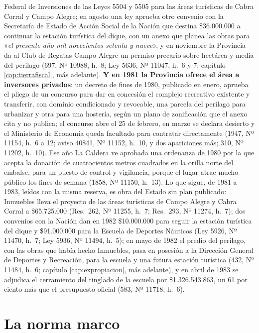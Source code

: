 \begin{cautela}
Federal de Inversiones de las Leyes 5504 y 5505 para las áreas turísticas de Cabra Corral y Campo Alegre; en agosto una ley aprueba otro convenio con la Secretaría de Estado de Acción Social de la Nación que destina \$36.000.000 a continuar la estación turística del dique, con un anexo que planea las obras para «\textit{el presente año mil novecientos setenta y nueve}», y en noviembre la Provincia da al Club de Regatas Campo Alegre un permiso precario sobre hectárea y media del perilago (697, Nº 10988, h.\ 8; Ley 5636, Nº 11047, h.\ 6 y 7; capítulo \ref{cap:tierrafiscal}, más adelante). \textbf{Y en 1981 la Provincia ofrece el área a inversores privados}: un decreto de fines de 1980, publicado en enero, aprueba el pliego de un concurso para dar en concesión el complejo recreativo existente y transferir, con dominio condicionado y revocable, una parcela del perilago para urbanizar y otra para una hostería, según un plano de zonificación que el anexo cita y no publica; el concurso abre el 25 de febrero, en marzo se declara desierto y el Ministerio de Economía queda facultado para contratar directamente (1947, Nº 11154, h.\ 6 a 12; aviso 40841, Nº 11152, h.\ 10, y dos apariciones más; 310, Nº 11202, h.\ 10). Ese año La Caldera ve aprobada una ordenanza de 1980 por la que acepta la donación de cuatrocientos metros cuadrados en la orilla norte del embalse, para un puesto de control y vigilancia, porque el lugar atrae mucho público los fines de semana (1858, Nº 11150, h.\ 13). Lo que sigue, de 1981 a 1983, leídos con la misma reserva, es obra del Estado sin plan publicado: Inmuebles lleva el proyecto de las áreas turísticas de Campo Alegre y Cabra Corral a \$65.725.000 (Res.\ 262, Nº 11255, h.\ 7; Res.\ 293, Nº 11274, h.\ 7); dos convenios con la Nación dan en 1982 \$10.000.000 para seguir la estación turística del dique y \$91.000.000 para la Escuela de Deportes Náuticos (Ley 5926, Nº 11470, h.\ 7; Ley 5936, Nº 11494, h.\ 5); en mayo de 1982 el predio del perilago, con las obras que había hecho Inmuebles, pasa en posesión a la Dirección General de Deportes y Recreación, para la escuela y una futura estación turística (432, Nº 11484, h.\ 6; capítulo \ref{cap:expropiacion}, más adelante), y en abril de 1983 se adjudica el cerramiento del tinglado de la escuela por \$1.326.543.863, un 61 por ciento más que el presupuesto oficial (583, Nº 11718, h.\ 6).
\end{cautela}

\section{La norma marco}

